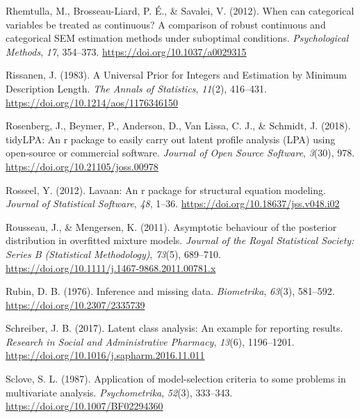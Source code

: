 \documentclass[
  ,man,floatsintext]{apa6}
\newlength{\cslhangindent}
\newlength{\cslentryspacingunit} %
\newenvironment{CSLReferences}[2] %
 {%
  \setlength{\parindent}{0pt}
  \ifodd #1
  \let\oldpar\par
  \def\par{\hangindent=\cslhangindent\oldpar}
  \fi
  \setlength{\parskip}{#2\cslentryspacingunit}
 }%
 {}
\begin{document}
\begin{CSLReferences}{1}{0}
\leavevmode{}%
Rhemtulla, M., Brosseau-Liard, P. É., \& Savalei, V. (2012). When can categorical variables be treated as continuous? A comparison of robust continuous and categorical {SEM} estimation methods under suboptimal conditions. \emph{Psychological Methods}, \emph{17}, 354--373. \url{https://doi.org/10.1037/a0029315}

\leavevmode{}%
Rissanen, J. (1983). {A Universal Prior for Integers and Estimation by Minimum Description Length}. \emph{The Annals of Statistics}, \emph{11}(2), 416--431. \url{https://doi.org/10.1214/aos/1176346150}

\leavevmode{}%
Rosenberg, J., Beymer, P., Anderson, D., Van Lissa, C. J., \& Schmidt, J. (2018). {tidyLPA}: An r package to easily carry out latent profile analysis ({LPA}) using open-source or commercial software. \emph{Journal of Open Source Software}, \emph{3}(30), 978. \url{https://doi.org/10.21105/joss.00978}

\leavevmode{}%
Rosseel, Y. (2012). Lavaan: An r package for structural equation modeling. \emph{Journal of Statistical Software}, \emph{48}, 1--36. \url{https://doi.org/10.18637/jss.v048.i02}

\leavevmode{}%
Rousseau, J., \& Mengersen, K. (2011). Asymptotic behaviour of the posterior distribution in overfitted mixture models. \emph{Journal of the Royal Statistical Society: Series B (Statistical Methodology)}, \emph{73}(5), 689--710. \url{https://doi.org/10.1111/j.1467-9868.2011.00781.x}

\leavevmode{}%
Rubin, D. B. (1976). Inference and missing data. \emph{Biometrika}, \emph{63}(3), 581--592. \url{https://doi.org/10.2307/2335739}

\leavevmode{}%
Schreiber, J. B. (2017). Latent class analysis: An example for reporting results. \emph{Research in Social and Administrative Pharmacy}, \emph{13}(6), 1196--1201. \url{https://doi.org/10.1016/j.sapharm.2016.11.011}

\leavevmode{}%
Sclove, S. L. (1987). Application of model-selection criteria to some problems in multivariate analysis. \emph{Psychometrika}, \emph{52}(3), 333--343. \url{https://doi.org/10.1007/BF02294360}


\end{CSLReferences}
\end{document}
